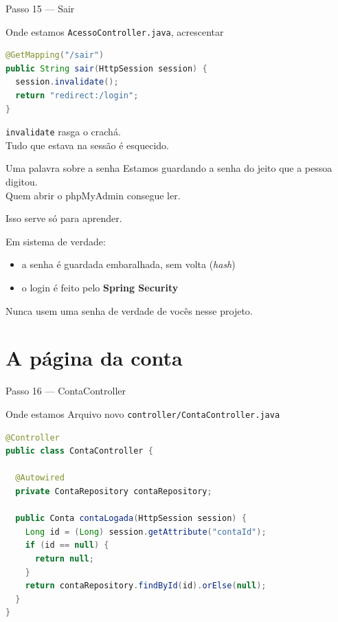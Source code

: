 \documentclass[aspectratio=169,11pt]{beamer}
\newcommand{\onde}[1]{%
  \begin{block}{Onde estamos}
    #1
  \end{block}
}
\begin{document}
\begin{frame}[fragile]{Passo 15 --- Sair}
  \onde{\texttt{AcessoController.java}, acrescentar}

\begin{lstlisting}[language=Java,basicstyle=\ttfamily\footnotesize]
@GetMapping("/sair")
public String sair(HttpSession session) {
  session.invalidate();
  return "redirect:/login";
}
\end{lstlisting}

  \vspace{0.4em}
  \texttt{invalidate} rasga o crachá.\\
  Tudo que estava na sessão é esquecido.
\end{frame}

\begin{frame}{Uma palavra sobre a senha}
  Estamos guardando a senha do jeito que a pessoa digitou.\\
  Quem abrir o phpMyAdmin consegue ler.

  \vspace{0.6em}
  Isso serve só para aprender.

  \vspace{0.6em}
  Em sistema de verdade:
  \begin{itemize}
    \item a senha é guardada embaralhada, sem volta (\textit{hash})
    \item o login é feito pelo \textbf{Spring Security}
  \end{itemize}

  \vspace{0.6em}
  Nunca usem uma senha de verdade de vocês nesse projeto.
\end{frame}

\section{A página da conta}

\begin{frame}[fragile]{Passo 16 --- ContaController}
  \onde{Arquivo novo \texttt{controller/ContaController.java}}

\begin{lstlisting}[language=Java,basicstyle=\ttfamily\scriptsize]
@Controller
public class ContaController {

  @Autowired
  private ContaRepository contaRepository;

  public Conta contaLogada(HttpSession session) {
    Long id = (Long) session.getAttribute("contaId");
    if (id == null) {
      return null;
    }
    return contaRepository.findById(id).orElse(null);
  }
}
\end{lstlisting}

\end{frame}
\end{document}
